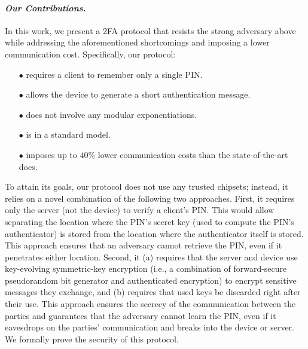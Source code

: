 \paragraph{\textbf{\textit{Our Contributions.}}}  In this work, we present a 2FA protocol that resists the strong adversary above while addressing the aforementioned shortcomings and imposing a lower communication cost. Specifically, our protocol:

\begin{itemize}
\item[$\bullet$] requires a client to remember only a single PIN.

\item[$\bullet$] {allows the device to generate a short authentication message.} 

\item[$\bullet$] does not involve any modular exponentiations.

\item[$\bullet$] is in a standard model.

\item[$\bullet$]  imposes up to $40\%$ lower communication costs than the state-of-the-art does. 


\end{itemize}


 To attain its goals, our protocol does not use any trusted chipsets; instead, it relies on a novel combination of the following two approaches. First, it requires only the server  (not the device) to verify a client’s PIN. This would allow separating the location where the PIN’s secret key (used to compute the PIN’s authenticator) is stored from the location where the authenticator itself is stored. This approach ensures that an adversary cannot retrieve the PIN, even if it penetrates either location.  Second, it  (a) requires that the server and device use key-evolving symmetric-key encryption (i.e., a combination of forward-secure pseudorandom bit generator and authenticated encryption) to encrypt sensitive messages they exchange,  and (b) requires that used keys be discarded right after their use. This approach ensures the secrecy of the communication between the parties and guarantees that the adversary cannot learn the PIN, even if it eavesdrops on the parties' communication and breaks into the device or server. We formally prove the security of this protocol. 





